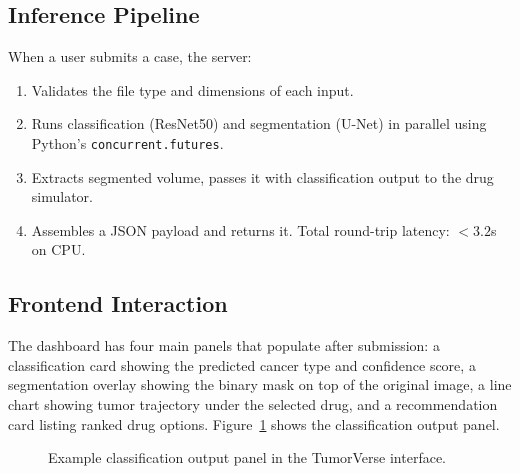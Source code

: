 \documentclass[conference]{IEEEtran}
\begin{document}
\subsection{Inference Pipeline}
When a user submits a case, the server:
\begin{enumerate}
    \item Validates the file type and dimensions of each input.
    \item Runs classification (ResNet50) and segmentation (U-Net) in parallel using Python's \texttt{concurrent.futures}.
    \item Extracts segmented volume, passes it with classification output to the drug simulator.
    \item Assembles a JSON payload and returns it. Total round-trip latency: $<3.2$s on CPU.
\end{enumerate}

\subsection{Frontend Interaction}
The dashboard has four main panels that populate after submission: a classification card showing the predicted cancer type and confidence score, a segmentation overlay showing the binary mask on top of the original image, a line chart showing tumor trajectory under the selected drug, and a recommendation card listing ranked drug options. Figure~\ref{fig:detection_ui} shows the classification output panel.

\begin{figure}[htbp]
\centering
{}
\caption{Example classification output panel in the TumorVerse interface.}
\label{fig:detection_ui}
\end{figure}
\end{document}
